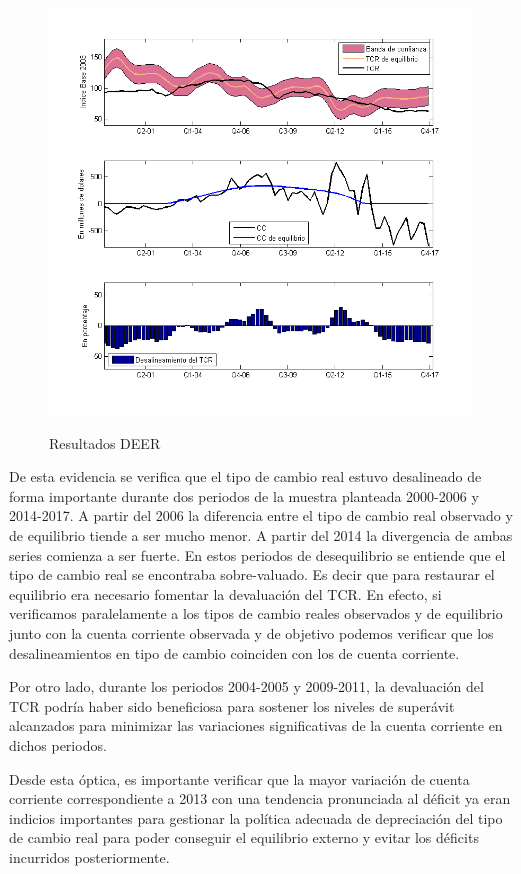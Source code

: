 \documentclass[12pt,letterpaper]{article}
\begin{document}
\begin{figure}
\caption{Resultados DEER}
\centering
\includegraphics[scale=0.7]{tcreq}
\label{deerq}
\end{figure}

De esta evidencia se verifica que el tipo de cambio real estuvo desalineado de forma importante durante dos periodos de la muestra planteada 2000-2006 y 2014-2017. A partir del 2006 la diferencia entre el tipo de cambio real observado y de equilibrio tiende a ser mucho menor. A partir del 2014 la divergencia de ambas series comienza a ser fuerte. En estos periodos de desequilibrio se entiende que el tipo de cambio real se encontraba sobre-valuado. Es decir que para restaurar el equilibrio era necesario fomentar la devaluación del TCR. En efecto, si verificamos paralelamente a los tipos de cambio reales observados y de equilibrio junto con la cuenta corriente observada y de objetivo podemos verificar que los desalineamientos en tipo de cambio coinciden con los de cuenta corriente. 

Por otro lado, durante los periodos 2004-2005 y 2009-2011, la devaluación del TCR podría haber sido beneficiosa para sostener los niveles de superávit alcanzados para minimizar las variaciones significativas de la cuenta corriente en dichos periodos.

Desde esta óptica, es importante verificar que la mayor variación de cuenta corriente correspondiente a 2013 con una tendencia pronunciada al déficit ya eran indicios importantes para gestionar la política adecuada de depreciación del tipo de cambio real para poder conseguir el equilibrio externo y evitar los déficits incurridos posteriormente.
\end{document}
